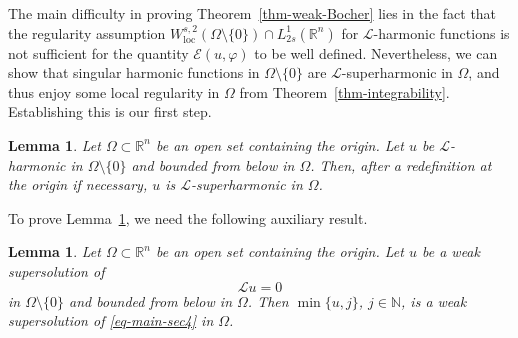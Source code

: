 \documentclass[11pt]{amsart}
\theoremstyle{plain}
\newtheorem{lemma}[theorem]{Lemma}
\theoremstyle{definition}
\numberwithin{equation}{section}
\begin{document}
The main difficulty in proving Theorem~\ref{thm-weak-Bocher} lies in the fact that the regularity assumption $W^{s, 2}_{\mathrm{loc}}(\Omega \setminus \{0\}) \cap L^{1}_{2s}(\mathbb{R}^n)$ for $\mathcal{L}$-harmonic functions is not sufficient for the quantity $\mathcal{E}(u, \varphi)$ to be well defined. Nevertheless, we can show that singular harmonic functions in $\Omega \setminus \{0\}$ are $\mathcal{L}$-superharmonic in $\Omega$, and thus enjoy some local regularity in $\Omega$ from Theorem~\ref{thm-integrability}. Establishing this is our first step.

\begin{lemma}\label{lem-superharmonic}
Let $\Omega \subset \mathbb{R}^n$ be an open set containing the origin. Let $u$ be $\mathcal{L}$-harmonic in $\Omega \setminus \{0\}$ and bounded from below in $\Omega$. Then, after a redefinition at the origin if necessary, $u$ is $\mathcal{L}$-superharmonic in $\Omega$.
\end{lemma}

To prove Lemma~\ref{lem-superharmonic}, we need the following auxiliary result.

\begin{lemma}\label{lem-supersolution}
Let $\Omega \subset \mathbb{R}^n$ be an open set containing the origin. Let $u$ be a weak supersolution of 
\begin{equation}\label{eq-main-sec4}
\mathcal{L}u=0
\end{equation}
in $\Omega \setminus \{0\}$ and bounded from below in $\Omega$. Then $\min\{u, j\}$, $j \in \mathbb{N}$, is a weak supersolution of \eqref{eq-main-sec4} in $\Omega$.
\end{lemma}
\end{document}
